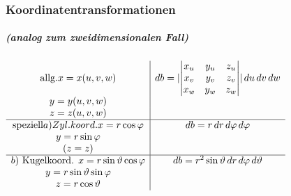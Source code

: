 \documentclass[a4paper]{scrartcl}
\begin{document}
\subsubsection{Koordinatentransformationen}
\subparagraph{(analog zum zweidimensionalen Fall)}
$\\ \begin{array}{c|c}
\text{allg.} x=x(u,v,w) & db = \lvert \begin{vmatrix} x_u & y_u & z_u \\ x_v & y_v & z_v \\ x_w & y_w & z_w \\ \end{vmatrix} \rvert \, du \, dv \, dw\\
y = y(u,v,w) & \\
z=z(u,v,w) & \\ \hline
\text{speziell} a) Zyl. koord. x=r \cos{\varphi} & db = r \, dr \, d\varphi \, d\varphi \\
y=r \sin{\varphi} & \\
(z = z) &\\ \hline
b) \text{ Kugelkoord. } x = r \sin{\vartheta} \cos{\varphi} & db = r^2 \sin{\vartheta} \, dr \, d\varphi \, d\vartheta \\
y= r \sin{\vartheta} \sin{\varphi} & \\
z = r \cos{\vartheta} & \\

\end{array}$
\end{document}
